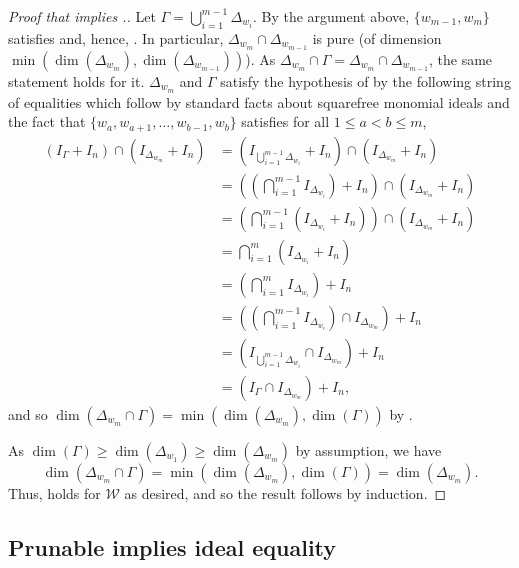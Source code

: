 \begin{proof}[Proof that  implies .]
    Let $\Gamma = \bigcup_{i=1}^{m-1}\Delta_{w_{i}}$. 
    By the argument above, $\{w_{m-1},w_m\}$ satisfies  and, hence, .
    In particular, $\Delta_{w_m}\cap \Delta_{w_{m-1}}$ is pure (of dimension $\min(\dim(\Delta_{w_m}),\dim(\Delta_{w_{m-1}}))$).
    As $\Delta_{w_m}\cap \Gamma =\Delta_{w_m}\cap \Delta_{w_{m-1}}$, the same statement holds for it.
    $\Delta_{w_m}$ and $\Gamma$ satisfy the hypothesis of  by the following string of equalities which follow by standard facts about squarefree monomial ideals and the fact that $\{w_a,w_{a+1},\dots,w_{b-1},w_b\}$ satisfies  for all $1\leq a<b\leq m$, 
    \begin{align*}
    (I_{\Gamma}+I_n) \cap (I_{\Delta_{w_m}}+I_n) 
    &= \left(I_{\bigcup_{i=1}^{m-1}\Delta_{w_i}}+I_n\right) \cap (I_{\Delta_{w_m}}+I_n)\\
    &= \left(\left(\bigcap_{i=1}^{m-1}I_{\Delta_{w_i}}\right)+I_n\right) \cap (I_{\Delta_{w_m}}+I_n)\\
    &= \left(\bigcap_{i=1}^{m-1}\left(I_{\Delta_{w_i}}+I_n\right)\right) \cap (I_{\Delta_{w_m}}+I_n)\\
    &= \bigcap_{i=1}^{m}\left(I_{\Delta_{w_i}}+I_n\right)\\
    &= \left(\bigcap_{i=1}^{m}I_{\Delta_{w_i}}\right)+I_n\\
    &= \left(\left(\bigcap_{i=1}^{m-1}I_{\Delta_{w_i}}\right)\cap I_{\Delta_{w_m}}\right)+I_n\\
    &= \left(I_{\bigcup_{i=1}^{m-1}\Delta_{w_i}}\cap I_{\Delta_{w_m}}\right)+I_n\\
    &=(I_{\Gamma}\cap I_{\Delta_{w_m}})+I_n,
    \end{align*}
    and so  $\dim\left(\Delta_{w_m}\cap \Gamma\right) = \min(\dim(\Delta_{w_m}),  \dim(\Gamma))$ by .

    As $\dim(\Gamma) \geq \dim(\Delta_{w_1})\geq \dim(\Delta_{w_m})$ by assumption, we have \[\dim\left(\Delta_{w_m}\cap \Gamma\right) = \min(\dim(\Delta_{w_m}),  \dim(\Gamma)) =\dim(\Delta_{w_m}).\]
    Thus,  holds for $\mathcal{W}$ as desired, and so the result follows by induction.
\end{proof}



\subsection{Prunable implies ideal equality}
\label{subsec:Prune_Equality}

